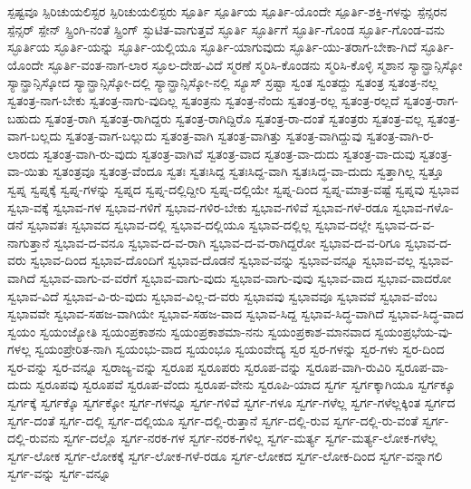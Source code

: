 {ಸ್ಪಷ್ಟವೂ
ಸ್ಪಿರಿಚುಯಲಿಸ್ಟರ
ಸ್ಪಿರಿಚುಯಲಿಸ್ಟರು
ಸ್ಪೂರ್ತಿ
ಸ್ಪೂರ್ತಿಯ
ಸ್ಪೂರ್ತಿ-ಯೊಂದೇ
ಸ್ಪೂರ್ತಿ-ಶಕ್ತಿ-ಗಳನ್ನು
ಸ್ಪೆನ್ಸರನ
ಸ್ಪೆನ್ಸರ್
ಸ್ಪೇನ್
ಸ್ಪ್ರಿಂಗಿ-ನಂತೆ
ಸ್ಪ್ರಿಂಗ್
ಸ್ಫುಟಿತ-ವಾಗುತ್ತವೆ
ಸ್ಫೂರ್ತಿ
ಸ್ಫೂರ್ತಿಗೆ
ಸ್ಫೂರ್ತಿ-ಗೊಂಡ
ಸ್ಫೂರ್ತಿ-ಗೊಂಡ-ವನು
ಸ್ಫೂರ್ತಿಯ
ಸ್ಫೂರ್ತಿ-ಯನ್ನು
ಸ್ಫೂರ್ತಿ-ಯಲ್ಲಿಯೂ
ಸ್ಫೂರ್ತಿ-ಯಾಗುವುದು
ಸ್ಫೂರ್ತಿ-ಯು-ತರಾಗ-ಬೇಕಾ-ಗಿದೆ
ಸ್ಫೂರ್ತಿ-ಯೊಂದೇ
ಸ್ಫೂರ್ತಿ-ವಂತ-ನಾಗ-ಲಾರ
ಸ್ಫೂಲ-ದೇಹ-ವಿದೆ
ಸ್ಮರಣೆ
ಸ್ಮರಿಸಿ-ಕೊಂಡನು
ಸ್ಮರಿಸಿ-ಕೊಳ್ಳಿ
ಸ್ಮಶಾನ
ಸ್ಯಾನ್ಫ್ರಾನ್ಸಿಸ್ಕೋ
ಸ್ಯಾನ್ಫ್ರಾನ್ಸಿಸ್ಕೋದ
ಸ್ಯಾನ್ಫ್ರಾನ್ಸಿಸ್ಕೋ-ದಲ್ಲಿ
ಸ್ಯಾನ್ಫ್ರಾನ್ಸಿಸ್ಕೋ-ನಲ್ಲಿ
ಸ್ಯೂಸ್
ಸ್ರಷ್ಟಾ
ಸ್ವಂತ
ಸ್ವಂತದ್ದು
ಸ್ವತಂತ್ರ
ಸ್ವತಂತ್ರ-ನಲ್ಲ
ಸ್ವತಂತ್ರ-ನಾಗ-ಬೇಕು
ಸ್ವತಂತ್ರ-ನಾಗು-ವುದಿಲ್ಲ
ಸ್ವತಂತ್ರನು
ಸ್ವತಂತ್ರ-ನೆಂದು
ಸ್ವತಂತ್ರ-ರಲ್ಲ
ಸ್ವತಂತ್ರ-ರಲ್ಲದೆ
ಸ್ವತಂತ್ರ-ರಾಗ-ಬಹುದು
ಸ್ವತಂತ್ರ-ರಾಗಿ
ಸ್ವತಂತ್ರ-ರಾಗಿದ್ದರು
ಸ್ವತಂತ್ರ-ರಾಗಿದ್ದಿರೊ
ಸ್ವತಂತ್ರ-ರಾ-ದಂತೆ
ಸ್ವತಂತ್ರರು
ಸ್ವತಂತ್ರ-ವಲ್ಲ
ಸ್ವತಂತ್ರ-ವಾಗ-ಬಲ್ಲದು
ಸ್ವತಂತ್ರ-ವಾಗ-ಬಲ್ಲುದು
ಸ್ವತಂತ್ರ-ವಾಗಿ
ಸ್ವತಂತ್ರ-ವಾಗಿತ್ತು
ಸ್ವತಂತ್ರ-ವಾಗಿದ್ದುವು
ಸ್ವತಂತ್ರ-ವಾಗಿ-ರ-ಲಾರದು
ಸ್ವತಂತ್ರ-ವಾಗಿ-ರು-ವುದು
ಸ್ವತಂತ್ರ-ವಾಗಿವೆ
ಸ್ವತಂತ್ರ-ವಾದ
ಸ್ವತಂತ್ರ-ವಾ-ದುದು
ಸ್ವತಂತ್ರ-ವಾ-ದುವು
ಸ್ವತಂತ್ರ-ವಾ-ಯಿತು
ಸ್ವತಂತ್ರವೂ
ಸ್ವತಂತ್ರ-ವೆಂದೂ
ಸ್ವತಃ
ಸ್ವತಃಸಿದ್ದ
ಸ್ವತಃಸಿದ್ದ-ವಾಗಿ
ಸ್ವತಃಸಿದ್ಧ-ವಾ-ದುದು
ಸ್ವತ್ತಾಗಿಲ್ಲ
ಸ್ವತ್ತೂ
ಸ್ವಪ್ನ
ಸ್ವಪ್ನಕ್ಕೆ
ಸ್ವಪ್ನ-ಗಳನ್ನು
ಸ್ವಪ್ನದ
ಸ್ವಪ್ನ-ದಲ್ಲಿದ್ದೀರಿ
ಸ್ವಪ್ನ-ದಲ್ಲಿಯೇ
ಸ್ವಪ್ನ-ದಿಂದ
ಸ್ವಪ್ನ-ಮಾತ್ರ-ವಷ್ಟೆ
ಸ್ವಪ್ನವು
ಸ್ವಭಾವ
ಸ್ವಭಾ-ವಕ್ಕೆ
ಸ್ವಭಾವ-ಗಳ
ಸ್ವಭಾವ-ಗಳಿಗೆ
ಸ್ವಭಾವ-ಗಳಿರ-ಬೇಕು
ಸ್ವಭಾವ-ಗಳಿವೆ
ಸ್ವಭಾವ-ಗಳೆ-ರಡೂ
ಸ್ವಭಾವ-ಗಳೊ-ಡನೆ
ಸ್ವಭಾವತಃ
ಸ್ವಭಾವದ
ಸ್ವಭಾವ-ದಲ್ಲಿ
ಸ್ವಭಾವ-ದಲ್ಲಿಯೂ
ಸ್ವಭಾವ-ದಲ್ಲಿಲ್ಲ
ಸ್ವಭಾವ-ದಲ್ಲೇ
ಸ್ವಭಾವ-ದ-ವ-ನಾಗುತ್ತಾನೆ
ಸ್ವಭಾವ-ದ-ವನೂ
ಸ್ವಭಾವ-ದ-ವ-ರಾಗಿ
ಸ್ವಭಾವ-ದ-ವ-ರಾಗಿದ್ದರೋ
ಸ್ವಭಾವ-ದ-ವ-ರಿಗೂ
ಸ್ವಭಾವ-ದ-ವರು
ಸ್ವಭಾವ-ದಿಂದ
ಸ್ವಭಾವ-ದೊಂದಿಗೆ
ಸ್ವಭಾವ-ದೊಡನೆ
ಸ್ವಭಾವ-ವನ್ನು
ಸ್ವಭಾವ-ವನ್ನೂ
ಸ್ವಭಾವ-ವಲ್ಲ
ಸ್ವಭಾವ-ವಾಗಿದೆ
ಸ್ವಭಾವ-ವಾಗು-ವ-ವರೆಗೆ
ಸ್ವಭಾವ-ವಾಗು-ವುದು
ಸ್ವಭಾವ-ವಾಗು-ವುವು
ಸ್ವಭಾವ-ವಾದ
ಸ್ವಭಾವ-ವಾದರೋ
ಸ್ವಭಾವ-ವಿದೆ
ಸ್ವಭಾವ-ವಿ-ರು-ವುದು
ಸ್ವಭಾವ-ವಿಲ್ಲ-ದ-ವರು
ಸ್ವಭಾವವು
ಸ್ವಭಾವವೂ
ಸ್ವಭಾವವೆ
ಸ್ವಭಾವ-ವೆಂಬ
ಸ್ವಭಾವವೇ
ಸ್ವಭಾವ-ಸಹಜ-ವಾಗಿಯೇ
ಸ್ವಭಾವ-ಸಹಜ-ವಾದ
ಸ್ವಭಾವ-ಸಿದ್ದ
ಸ್ವಭಾವ-ಸಿದ್ಧ-ವಾಗಿದೆ
ಸ್ವಭಾವ-ಸಿದ್ಧ-ವಾದ
ಸ್ವಯಂ
ಸ್ವಯಂಜ್ಯೋತಿ
ಸ್ವಯಂಪ್ರಕಾಶನು
ಸ್ವಯಂಪ್ರಕಾಶಮಾ-ನನು
ಸ್ವಯಂಪ್ರಕಾಶ-ಮಾನವಾದ
ಸ್ವಯಂಪ್ರಭೆಯ-ವು-ಗಳಲ್ಲ
ಸ್ವಯಂಪ್ರೇರಿತ-ನಾಗಿ
ಸ್ವಯಂಭು-ವಾದ
ಸ್ವಯಂಭೂ
ಸ್ವಯಂವೇದ್ಯ
ಸ್ವರ
ಸ್ವರ-ಗಳನ್ನು
ಸ್ವರ-ಗಳು
ಸ್ವರ-ದಿಂದ
ಸ್ವರ-ವನ್ನು
ಸ್ವರ-ವನ್ನೂ
ಸ್ವರಾಜ್ಯ-ವನ್ನು
ಸ್ವರೂಪ
ಸ್ವರೂಪರು
ಸ್ವರೂಪ-ವನ್ನು
ಸ್ವರೂಪ-ವಾಗಿ-ರುವಿರಿ
ಸ್ವರೂಪ-ವಾ-ದುದು
ಸ್ವರೂಪವು
ಸ್ವರೂಪವೆ
ಸ್ವರೂಪ-ವೆಂದು
ಸ್ವರೂಪ-ವೇನು
ಸ್ವರೂಪಿ-ಯಾದ
ಸ್ವರ್ಗ
ಸ್ವರ್ಗಕ್ಕಾಗಿಯೂ
ಸ್ವರ್ಗಕ್ಕೂ
ಸ್ವರ್ಗಕ್ಕೆ
ಸ್ವರ್ಗಕ್ಕೊ
ಸ್ವರ್ಗಕ್ಕೋ
ಸ್ವರ್ಗ-ಗಳನ್ನೂ
ಸ್ವರ್ಗ-ಗಳಿವೆ
ಸ್ವರ್ಗ-ಗಳೂ
ಸ್ವರ್ಗ-ಗಳೆಲ್ಲ
ಸ್ವರ್ಗ-ಗಳೆಲ್ಲಕ್ಕಿಂತ
ಸ್ವರ್ಗದ
ಸ್ವರ್ಗ-ದಂತೆ
ಸ್ವರ್ಗ-ದಲ್ಲಿ
ಸ್ವರ್ಗ-ದಲ್ಲಿಯೂ
ಸ್ವರ್ಗ-ದಲ್ಲಿ-ರುತ್ತಾನೆ
ಸ್ವರ್ಗ-ದಲ್ಲಿ-ರುವ
ಸ್ವರ್ಗ-ದಲ್ಲಿ-ರು-ವಂತೆ
ಸ್ವರ್ಗ-ದಲ್ಲಿ-ರುವನು
ಸ್ವರ್ಗ-ದಲ್ಲೊ
ಸ್ವರ್ಗ-ನರಕ-ಗಳ
ಸ್ವರ್ಗ-ನರಕ-ಗಳಿಲ್ಲ
ಸ್ವರ್ಗ-ಮರ್ತ್ಯ
ಸ್ವರ್ಗ-ಮರ್ತ್ಯ-ಲೋಕ-ಗಳೆಲ್ಲ
ಸ್ವರ್ಗ-ಲೋಕ
ಸ್ವರ್ಗ-ಲೋಕಕ್ಕೆ
ಸ್ವರ್ಗ-ಲೋಕ-ಗಳೆ-ರಡೂ
ಸ್ವರ್ಗ-ಲೋಕದ
ಸ್ವರ್ಗ-ಲೋಕ-ದಿಂದ
ಸ್ವರ್ಗ-ವನ್ನಾಗಲಿ
ಸ್ವರ್ಗ-ವನ್ನು
ಸ್ವರ್ಗ-ವನ್ನೂ
}
